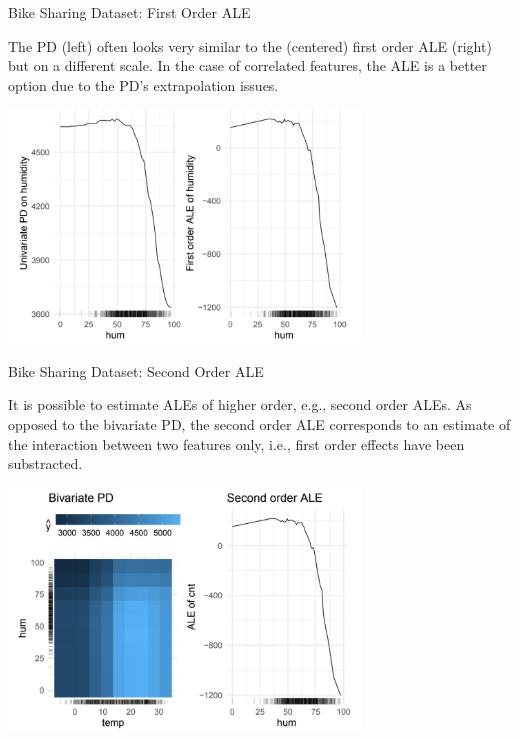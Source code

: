 \documentclass[11pt,compress,t,notes=noshow, xcolor=table]{beamer}
\begin{document}
\begin{vbframe}{Bike Sharing Dataset: First Order ALE}

The PD (left) often looks very similar to the (centered) first order ALE (right) but on a different scale. In the case of correlated features, the ALE is a better option due to the PD's extrapolation issues.


\begin{center}
\includegraphics[width=0.7\textwidth]{figure_man/first-order.png}
\end{center}


\end{vbframe}


\begin{vbframe}{Bike Sharing Dataset: Second Order ALE}

It is possible to estimate ALEs of higher order, e.g., second order ALEs. As opposed to the bivariate PD, the second order ALE corresponds to an estimate of the interaction between two features only, i.e., first order effects have been substracted.

\vspace{0.1cm}

\begin{center}
\includegraphics[width=0.7\textwidth]{figure_man/second-order.png}
\end{center}

\end{vbframe}


\endlecture
\end{document}
